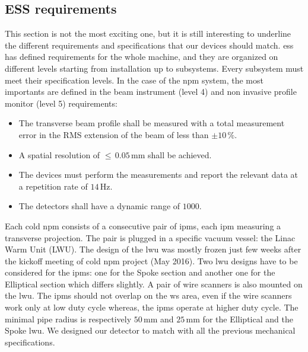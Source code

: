 \begin{refsection}
	\section{ESS requirements}
	This section is not the most exciting one, but it is still interesting to underline the different requirements and specifications that our devices should match. \acrshort{ess} has defined requirements for the whole machine, and they are organized on different levels starting from installation up to subsystems. Every subsystem must meet their specification levels. In the case of the \acrshort{npm} system, the most importants are defined in the beam instrument (level 4) and non invasive profile monitor (level 5) requirements:
	\begin{itemize}
		\item The transverse beam profile shall be measured with a total measurement error in the RMS extension of the beam of less than $\pm10\,\%$.
		\item A spatial resolution of \(\leq\,0.05\,\mathrm{mm}\) shall be achieved.
		\item The devices must perform the measurements and report the relevant data at a repetition rate of \(14\,\mathrm{Hz}\).
		\item The detectors shall have a dynamic range of $1000$.
	\end{itemize}

	Each cold \acrshort{npm} consists of a consecutive pair of \acrshort{ipm}s, each \acrshort{ipm} measuring a transverse projection. The pair is plugged in a specific vacuum vessel: the Linac Warm Unit (LWU). The design of the \acrshort{lwu} was mostly frozen just few weeks after the kickoff meeting of cold \acrshort{npm} project (May 2016). Two \acrshort{lwu} designs have to be considered for the \acrshort{ipm}s: one for the Spoke section and another one for the Elliptical section which differs slightly. A pair of wire scanners is also mounted on the \acrshort{lwu}. The \acrshort{ipm}s should not overlap on the \acrshort{ws} area, even if the wire scanners work only at low duty cycle whereas, the \acrshort{ipm}s operate at higher duty cycle. The minimal pipe radius is respectively \(50\,\mathrm{mm}\) and \(25\,\mathrm{mm}\) for the Elliptical and the Spoke \acrshort{lwu}. We designed our detector to match with all the previous mechanical specifications.

	


\end{refsection}
